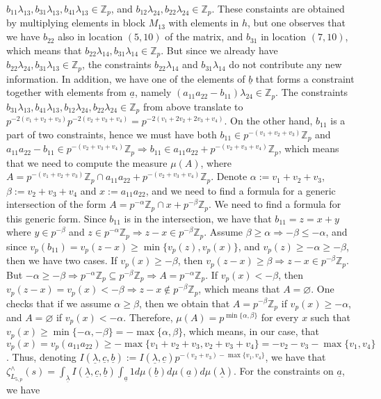 \documentclass{article}
\begin{document}
$b_{11}\lambda_{13},b_{31}\lambda_{13},b_{41}\lambda_{13}\in\mathbb{Z}_{p}$, and $b_{12}\lambda_{24},b_{22}\lambda_{24}\in\mathbb{Z}_{p}$. These constaints are obtained by multiplying elements in block $M_{13}$ with elements in $h$, but one observes that we have $b_{22}$ also in location $(5,10)$ of the matrix, and $b_{31}$ in location $(7,10)$, which means that $b_{22}\lambda_{14},b_{31}\lambda_{14}\in\mathbb{Z}_{p}$. But since we already have $b_{22}\lambda_{24},b_{31}\lambda_{13}\in\mathbb{Z}_{p}$, the constraints $b_{22}\lambda_{14}$ and $b_{31}\lambda_{14}$ do not contribute any new information. In addition, we have one of the elements of $\underline{b}$ that forms a constraint together with elements from $\underline{a}$, namely $(a_{11}a_{22}-b_{11})\lambda_{24}\in\mathbb{Z}_{p}$. The constraints $b_{31}\lambda_{13},b_{41}\lambda_{13},b_{12}\lambda_{24},b_{22}\lambda_{24}\in\mathbb{Z}_{p}$ from above translate to $p^{-2(v_{1}+v_{2}+v_{3})}p^{-2(v_{2}+v_{3}+v_{4})}=p^{-2(v_{1}+2v_{2}+2v_{3}+v_{4})}$. On the other hand, $b_{11}$ is a part of two constraints, hence we must have both $b_{11}\in{p^{-(v_{1}+v_{2}+v_{3})}\mathbb{Z}_{p}}$ and $a_{11}a_{22}-b_{11}\in{p^{-(v_{2}+v_{3}+v_{4})}\mathbb{Z}_{p}}\Rightarrow{b_{11}\in{a_{11}a_{22}+p^{-(v_{2}+v_{3}+v_{4})}\mathbb{Z}_{p}}}$, which means that we need to compute the measure $\mu(A)$, where $A=p^{-(v_{1}+v_{2}+v_{3})}\mathbb{Z}_{p}\cap{a_{11}a_{22}+p^{-(v_{2}+v_{3}+v_{4})}\mathbb{Z}_{p}}$. Denote $\alpha:=v_{1}+v_{2}+v_{3}$, $\beta:=v_{2}+v_{3}+v_{4}$ and $x:=a_{11}a_{22}$, and we need to find a formula for a generic intersection of the form $A={p^{-\alpha}\mathbb{Z}_{p}\cap{x+p^{-\beta}}\mathbb{Z}_{p}}$. We need to find a formula for this generic form. Since $b_{11}$ is in the intersection, we have that $b_{11}=z=x+y$ where $y\in{p^{-\beta}}$ and $z\in{p^{-\alpha}\mathbb{Z}_{p}}\Rightarrow{z-x\in{p^{-\beta}\mathbb{Z}_{p}}}$. Assume $\beta\geq\alpha\Rightarrow{-\beta\leq-\alpha}$, and since $v_{p}(b_{11})=v_{p}(z-x)\geq{\min\{v_{p}(z),v_{p}(x)\}}$, and $v_{p}(z)\geq{-\alpha}\geq{-\beta}$, then we have two cases. If $v_{p}(x)\geq{-\beta}$, then $v_{p}(z-x)\geq{\beta}\Rightarrow{z-x\in{p^{-\beta}\mathbb{Z}_{p}}}$. But $-\alpha\geq{-\beta}\Rightarrow{p^{-\alpha}\mathbb{Z}_{p}\subseteq{p^{-\beta}\mathbb{Z}_{p}}}\Rightarrow{A=p^{-\alpha}\mathbb{Z}_{p}}$. If $v_{p}(x)<{-\beta}$, then $v_{p}(z-x)=v_{p}(x)<-\beta\Rightarrow{z-x}\notin{p^{-\beta}\mathbb{Z}_{p}}$, which means that $A=\varnothing$. One checks that if we assume $\alpha\geq\beta$, then we obtain that $A=p^{-\beta}\mathbb{Z}_{p}$ if $v_{p}(x)\geq{-\alpha}$, and $A=\varnothing$ if $v_{p}(x)<-\alpha$. Therefore, $\mu(A)=p^{\min\{\alpha,\beta\}}$ for every $x$ such that $v_{p}(x)\geq\min\{-\alpha,-\beta\}=-\max\{\alpha,\beta\}$, which means, in our case, that $v_{p}(x)=v_{p}(a_{11}a_{22})\geq-\max\{v_{1}+v_{2}+v_{3},v_{2}+v_{3}+v_{4}\}=-v_{2}-v_{3}-\max\{v_{1},v_{4}\}$. Thus, denoting $I(\underline{\lambda},\underline{c},\underline{b}):=I(\underline{\lambda},\underline{c})p^{-(v_{2}+v_{3})-\max\{v_{1},v_{4}\}}$, we have that $\zeta_{L_{5,p}}^{\wedge}(s)=\displaystyle\int_{\underline\lambda}I(\underline{\lambda},\underline{c},\underline{b})\int_{\underline{a}}1d\mu(\underline{b})d\mu(\underline{a})d\mu(\underline{\lambda})$. For the constraints on $\underline{a}$, we have
\end{document}
